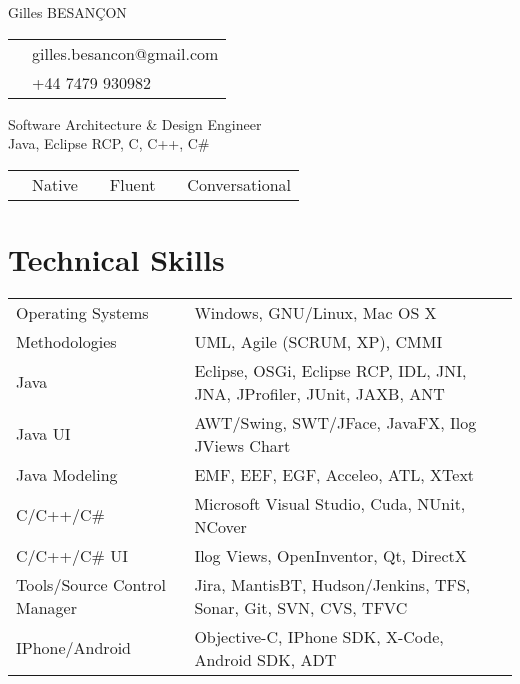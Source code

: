 \documentclass[10pt,letterpaper]{resume/resume}
\begin{document}
  \begin{minipage}[t]{\linewidth * 1 / 3}
    {\Large Gilles BESAN\c{C}ON}\\
      \begin{tabular}{c l}
         \email{&gilles.besancon@gmail.com}\\
         \phone{&+44 7479 930982}\\
      \end{tabular}
  \end{minipage}
  \begin{minipage}[t]{\linewidth * 2 / 3}
    \begin{center}
      {\huge{Software Architecture \& Design Engineer\\Java, Eclipse RCP, C, C++, C\#}}
      \begin{tabular}{c l c l c l}
      \french{French:&Native}&\englishus{English:&Fluent}&\spanish{Spanish:&Conversational}\\
      \end{tabular}
    \end{center}
  \end{minipage}
  
  \begin{minipage}[t]{\linewidth}
    \section{Technical Skills}
    \begin{tabular}{ll}
	Operating Systems&Windows, GNU/Linux, Mac OS X\\
	Methodologies&UML, Agile (SCRUM, XP), CMMI\\
	Java&Eclipse, OSGi, Eclipse RCP, IDL, JNI, JNA, JProfiler, JUnit, JAXB, ANT\\
	Java UI&AWT/Swing, SWT/JFace, JavaFX, Ilog JViews Chart\\
	Java Modeling&EMF, EEF, EGF, Acceleo, ATL, XText\\
	C/C++/C\#&Microsoft Visual Studio, Cuda, NUnit, NCover\\
	C/C++/C\# UI&Ilog Views, OpenInventor, Qt, DirectX\\
	Tools/Source Control Manager&Jira, MantisBT, Hudson/Jenkins, TFS, Sonar, Git, SVN, CVS, TFVC\\
	IPhone/Android&Objective-C, IPhone SDK, X-Code, Android SDK, ADT\\
    \end{tabular}
  \end{minipage}
  
\end{document}
